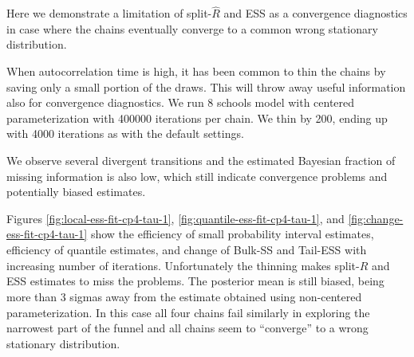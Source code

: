 \documentclass[american,]{article}
\begin{document}
Here we demonstrate a limitation of split-\(\widehat{R}\) and ESS as a
convergence diagnostics in case where the chains eventually converge
to a common wrong stationary distribution.

When autocorrelation time is high, it has been common to thin the
chains by saving only a small portion of the draws. This will throw
away useful information also for convergence diagnostics. We run 8
schools model with centered parameterization with 400000 iterations
per chain. We thin by 200, ending up with 4000 iterations as with the
default settings.

We observe several divergent transitions and the estimated Bayesian
fraction of missing information is also low, which still indicate
convergence problems and potentially biased estimates.

Figures \ref{fig:local-ess-fit-cp4-tau-1},
\ref{fig:quantile-ess-fit-cp4-tau-1}, and
\ref{fig:change-ess-fit-cp4-tau-1} show the efficiency of small
probability interval estimates, efficiency of quantile estimates, and
change of Bulk-SS and Tail-ESS with increasing number of iterations.
Unfortunately the thinning makes split-\(\widehat{R}\) and ESS
estimates to miss the problems. The posterior mean is still biased,
being more than 3 sigmas away from the estimate obtained using
non-centered parameterization. In this case all four chains fail
similarly in exploring the narrowest part of the funnel and all
chains seem to ``converge'' to a wrong stationary distribution.
\end{document}
